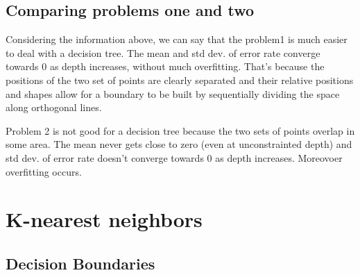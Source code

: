 \documentclass{article}
\begin{document}
\subsection{Comparing problems one and two}

Considering the information above, we can say that the problem1 is much easier to deal with  a decision tree. The mean and std dev. of error rate converge towards 0 as depth increases, without much overfitting.
That's because the positions of the two set of points are clearly separated and their relative positions and shapes allow for a boundary to be built by sequentially dividing the space along orthogonal lines. 

Problem 2 is not good for a decision tree because the two sets of points overlap in some area. The mean never gets close to zero (even at  unconstrainted depth) and std dev. of error rate doesn't converge towards 0 as depth increases. Moreovoer overfitting occurs.

\section{K-nearest neighbors}


\subsection{Decision Boundaries}
\end{document}
